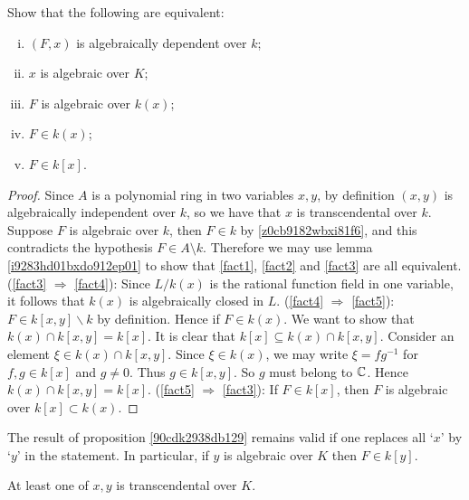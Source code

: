 \begin{proposition} \label {90cdk2938db129}
	Show that the following are equivalent:
	\begin{enumerate}[(i)]
	\item \label{fact1} $(F,x)$ is algebraically dependent over $ k$;
	\item \label{fact2} $x$ is algebraic over $K$;
	\item \label{fact3} $F$ is algebraic over $ k(x)$;
	\item \label{fact4} $F \in  k(x)$;
	\item \label{fact5} $F \in  k[x]$.
	\end{enumerate}
\end{proposition}

\begin{proof}
	Since $A$ is a polynomial ring in two variables $x,y$, by definition $(x,y)$ 
	is algebraically independent over $ k$, so we have that $x$ is transcendental 
	over $ k$. Suppose $F$ is algebraic over $ k$, 
	then $F \in  k$ by \ref{z0cb9182wbxi81f6}, 
	and this contradicts the hypothesis $F \in A \setminus k$.
	Therefore we may use lemma \ref{i9283hd01bxdo912ep01} 
	to show that \ref{fact1}, \ref{fact2} and \ref{fact3} are all equivalent.
	(\eqref{fact3} $\Rightarrow $ \eqref{fact4}): 
	Since $L/ k(x)$ is the rational function field 
	in one variable, it follows that $ k(x)$ is algebraically closed
	in $L$.
	(\eqref{fact4} $\Rightarrow $ \eqref{fact5}): 
	$ F \in  k[x,y] \backslash  k$ by definition. 
	Hence if $F\in  k(x) $. We want to show that 
	$ k(x) \cap  k[x,y] =  k[x]$. 
	It is clear that $ k[x] \subseteq k(x) \cap  k[x,y]$.
	Consider an element $\xi \in  k(x) \cap  k[x,y]$.
	Since $\xi \in  k(x)$, we may write $\xi = fg^{-1}$ for
	$f,g\in  k[x]$ and $g \neq 0$. Thus $g \in  k[x,y]$. 
	So $g$ must belong to $\mathbb{C}$. Hence $ k(x) \cap  k[x,y] =  k[x]$.
	(\eqref{fact5} $\Rightarrow $ \eqref{fact3}):
	If $F \in  k[x]$, then $F$ is algebraic over $ k[x] \subset  k(x)$.
\end{proof}


\begin{remark}
	The result of proposition \ref{90cdk2938db129} remains valid 
	if one replaces all `$x$' by `$y$' in the statement.
	In particular, if $y$ is algebraic over $K$ then $F \in  k[y]$.
\end{remark}

\begin{corollary} \label {9fo13d912o9o0}
	At least one of $x,y$ is transcendental over $K$.
\end{corollary}

